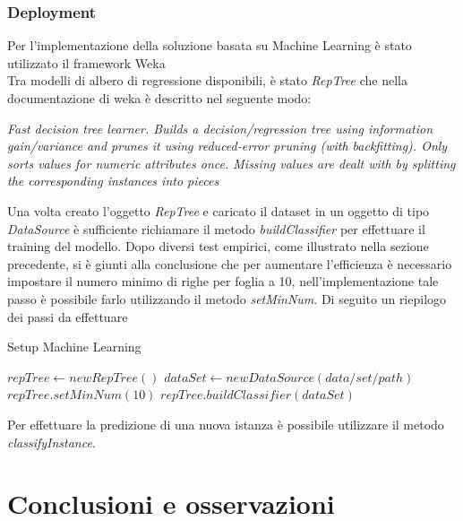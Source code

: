 \documentclass[a4paper, 11pt, oneside]{report}
\begin{document}
            \section{Deployment}
            Per l'implementazione della soluzione basata su Machine Learning è stato utilizzato il framework Weka\cite{2}\\
            Tra modelli di albero di regressione disponibili, è stato \emph{RepTree} che nella documentazione di weka è descritto nel seguente modo:
            \begin{center}
                \emph{Fast decision tree learner. Builds a decision/regression tree using information gain/variance and prunes it using reduced-error pruning (with backfitting).
                Only sorts values for numeric attributes once. Missing values are dealt with by splitting the corresponding instances into pieces}
            \end{center}
            Una volta creato l'oggetto \emph{RepTree} e caricato il dataset in un oggetto di tipo \emph{DataSource} è sufficiente richiamare il metodo
            \emph{buildClassifier} per effettuare il training del modello.
            Dopo diversi test empirici, come illustrato nella sezione precedente, si è giunti alla conclusione che per aumentare l'efficienza è necessario
            impostare il numero minimo di righe per foglia a 10, nell'implementazione tale passo è possibile farlo utilizzando il metodo \emph{setMinNum}.
            Di seguito un riepilogo dei passi da effettuare
            \medskip
            \begin{algorithm}
                \caption{Setup Machine Learning}
                \label{alg:ml}
                \begin{algorithmic}[2]
                    \State $repTree \gets new RepTree()$
                    \State $dataSet \gets new DataSource(data/set/path)$
                    \State
                    \State $repTree.setMinNum(10)$
                    \State $repTree.buildClassifier(dataSet)$
                \end{algorithmic}
            \end{algorithm}
            \par \noindent Per effettuare la predizione di una nuova istanza è possibile utilizzare il metodo \emph{classifyInstance}.






    \part{Conclusioni e osservazioni}
\end{document}
